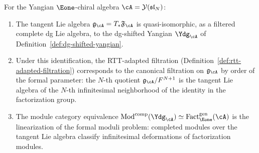 \begin{conjecture}
\label{conj:dk4-formal-moduli}
For the Yangian $\Eone$-chiral algebra
$\cA = \mathcal{Y}(\mathfrak{sl}_N)$:
\begin{enumerate}[label=\textup{(\alph*)}]
\item The tangent Lie algebra
  $\mathfrak{g}_{\cA} = T_{*}\mathfrak{F}_{\cA}$
  is quasi-isomorphic, as a filtered complete dg Lie algebra, to the
  dg-shifted Yangian $\Ydg_{\cA}$ of
  Definition~\textup{\ref{def:dg-shifted-yangian}}.
\item Under this identification, the RTT-adapted filtration
  \textup{(}Definition~\textup{\ref{def:rtt-adapted-filtration}}\textup{)}
  corresponds to the canonical filtration on
  $\mathfrak{g}_{\cA}$ by order of the formal parameter: the $N$-th
  quotient $\mathfrak{g}_{\cA}/F^{N+1}$ is the tangent Lie algebra
  of the $N$-th infinitesimal neighborhood of the identity in the
  factorization group.
\item The module category equivalence
  $\operatorname{Mod}^{\mathrm{comp}}(\Ydg_{\cA}) \simeq
  \operatorname{Fact}_{\Eone}^{\mathrm{gen}}(\cA)$
  is the linearization of the formal moduli problem:
  completed modules over the tangent Lie algebra classify
  infinitesimal deformations of factorization modules.
\end{enumerate}
\end{conjecture}

